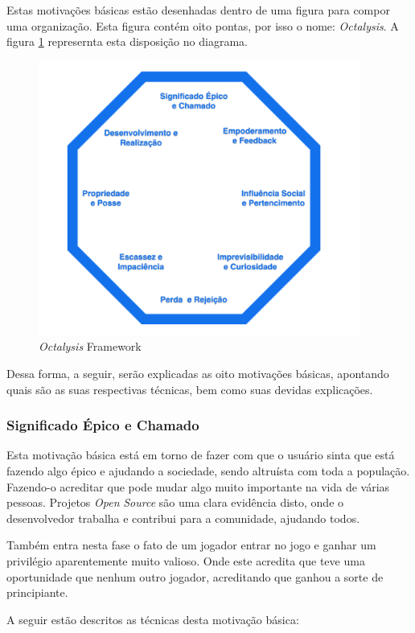 Estas motivações básicas estão desenhadas dentro de uma figura para
compor uma organização. Esta figura contém oito pontas, por isso o nome:
\textit{Octalysis}. A figura \ref{fig:octalysisframework} represernta esta
disposição no diagrama.

\begin{figure}[h]
    \centering
    \includegraphics[width=400px, scale=1]{figuras/octalysisframework}
    \caption{\textit{Octalysis} Framework}
    \label{fig:octalysisframework}
\end{figure}

Dessa forma, a seguir, serão explicadas as oito motivações básicas,
apontando quais são as suas respectivas técnicas, bem como
suas devidas explicações.

\subsubsection{Significado Épico e Chamado}
\label{sub:significadoepico}
Esta motivação básica está em torno de fazer com que o usuário sinta que
está fazendo algo épico e ajudando a sociedade, sendo altruísta com toda
a população. Fazendo-o acreditar que pode mudar algo muito importante
na vida de várias pessoas. Projetos \textit{Open} \textit{Source} são uma clara evidência
disto, onde o desenvolvedor trabalha e contribui para a comunidade, ajudando
todos.

Também entra nesta fase o fato de um jogador entrar no jogo e ganhar um
privilégio aparentemente muito valioso. Onde este acredita que teve uma
oportunidade que nenhum outro jogador, acreditando que ganhou a sorte de
principiante.

A seguir estão descritos as técnicas desta motivação básica:

